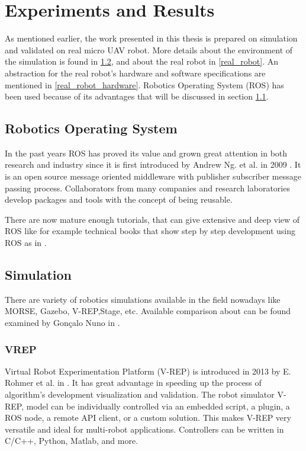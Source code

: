 \chapter{Experiments and Results}

As mentioned earlier, the work presented in this thesis is prepared on simulation and validated on real micro UAV robot. More details about the environment of the simulation is found in \ref{simu}, and about the real robot in \ref{real_robot}. An abstraction for the real robot's hardware and software specifications are mentioned in \ref{real_robot_hardware}. Robotics Operating System (ROS) has been used because of its advantages that will be discussed in section \ref{ROS_part}.

\section{Robotics Operating System} \label{ROS_part}
In the past years ROS has proved its value and grown great attention in both research and industry since it is first introduced by Andrew Ng. et al. in 2009 \cite{quigley2009ros}. It is an open source message oriented middleware with publisher subscriber message passing process. Collaborators from many companies and research laboratories develop packages and tools with the concept of being reusable. 



There are now mature enough tutorials, that can give extensive and deep view of ROS like for example technical books that show step by step development using ROS as in \cite{o2014gentle,joseph2015mastering}. 



\section{Simulation} \label{simu}
There are variety of robotics simulations available in the field nowadays like MORSE, Gazebo, V-REP,Stage, etc. Available comparison about can be found examined by Gonçalo Nuno in \cite{augusto2013robotteamsim}.
\vfill
\hfill

\subsection{VREP}
Virtual Robot Experimentation Platform (V-REP) is introduced in 2013 by E. Rohmer et al. in \cite{rohmer2013v}. It has great advantage in speeding up the process of algorithm's development visualization and validation. The robot simulator V-REP, model can be individually controlled via an embedded script, a plugin, a ROS node, a remote API client, or a custom solution. This makes V-REP very versatile and ideal for multi-robot applications. Controllers can be written in C/C++, Python, Matlab, and more.
\vfill
\hfill

